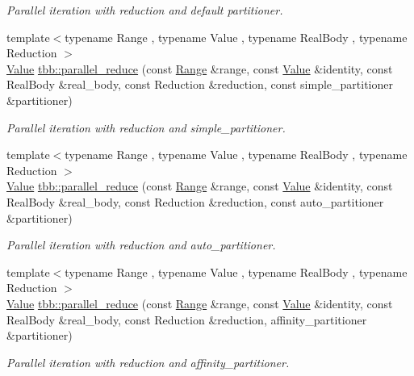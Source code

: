 \begin{DoxyCompactItemize}
\begin{DoxyCompactList}\small\item\em Parallel iteration with reduction and default partitioner. \end{DoxyCompactList}\item 
{\footnotesize template$<$typename Range , typename Value , typename Real\+Body , typename Reduction $>$ }\\\hyperlink{structValue}{Value} \hyperlink{group__algorithms_ga0b22fd1de0e8bbaf46587d3c63a1ed93}{tbb\+::parallel\+\_\+reduce} (const \hyperlink{classtbb_1_1blocked__range}{Range} \&range, const \hyperlink{structValue}{Value} \&identity, const Real\+Body \&real\+\_\+body, const Reduction \&reduction, const simple\+\_\+partitioner \&partitioner)
\begin{DoxyCompactList}\small\item\em Parallel iteration with reduction and simple\+\_\+partitioner. \end{DoxyCompactList}\item 
{\footnotesize template$<$typename Range , typename Value , typename Real\+Body , typename Reduction $>$ }\\\hyperlink{structValue}{Value} \hyperlink{group__algorithms_ga56e6b6e2eee521f532c00d855280be69}{tbb\+::parallel\+\_\+reduce} (const \hyperlink{classtbb_1_1blocked__range}{Range} \&range, const \hyperlink{structValue}{Value} \&identity, const Real\+Body \&real\+\_\+body, const Reduction \&reduction, const auto\+\_\+partitioner \&partitioner)
\begin{DoxyCompactList}\small\item\em Parallel iteration with reduction and auto\+\_\+partitioner. \end{DoxyCompactList}\item 
{\footnotesize template$<$typename Range , typename Value , typename Real\+Body , typename Reduction $>$ }\\\hyperlink{structValue}{Value} \hyperlink{group__algorithms_gac26c35d1983e7ac2ab003cc8e49dd7e6}{tbb\+::parallel\+\_\+reduce} (const \hyperlink{classtbb_1_1blocked__range}{Range} \&range, const \hyperlink{structValue}{Value} \&identity, const Real\+Body \&real\+\_\+body, const Reduction \&reduction, affinity\+\_\+partitioner \&partitioner)
\begin{DoxyCompactList}\small\item\em Parallel iteration with reduction and affinity\+\_\+partitioner. \end{DoxyCompactList}\item 

\end{DoxyCompactItemize}
